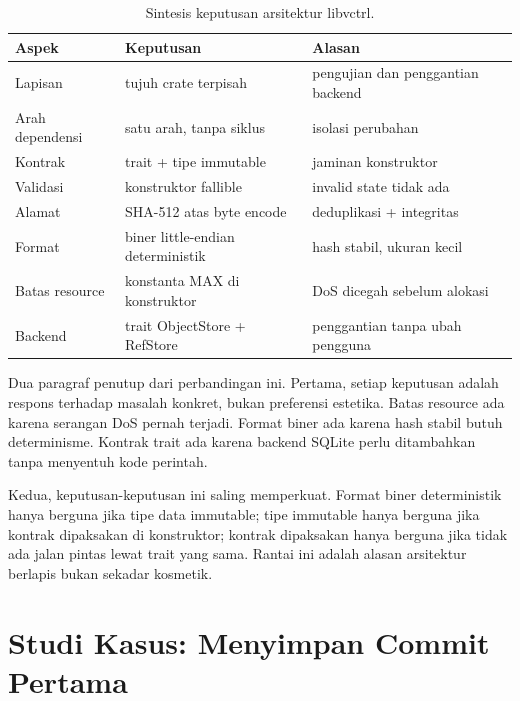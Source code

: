\documentclass[11pt,a4paper]{article}
\begin{document}
\begin{table}[H]
	\centering
	\caption{Sintesis keputusan arsitektur libvctrl.}
	\label{tab:synth}
	\footnotesize
	\begin{tabularx}{\textwidth}{l X X}
		\toprule
		Aspek           & Keputusan                         & Alasan                            \\
		\midrule
		Lapisan         & tujuh crate terpisah              & pengujian dan penggantian backend \\
		Arah dependensi & satu arah, tanpa siklus           & isolasi perubahan                 \\
		Kontrak         & trait + tipe immutable            & jaminan konstruktor               \\
		Validasi        & konstruktor fallible              & invalid state tidak ada           \\
		Alamat          & SHA-512 atas byte encode          & deduplikasi + integritas          \\
		Format          & biner little-endian deterministik & hash stabil, ukuran kecil         \\
		Batas resource  & konstanta MAX di konstruktor      & DoS dicegah sebelum alokasi       \\
		Backend         & trait ObjectStore + RefStore      & penggantian tanpa ubah pengguna   \\
		\bottomrule
	\end{tabularx}
\end{table}

Dua paragraf penutup dari perbandingan ini. Pertama, setiap keputusan adalah respons terhadap masalah konkret, bukan preferensi estetika. Batas resource ada karena serangan DoS pernah terjadi. Format biner ada karena hash stabil butuh determinisme. Kontrak trait ada karena backend SQLite perlu ditambahkan tanpa menyentuh kode perintah.

Kedua, keputusan-keputusan ini saling memperkuat. Format biner deterministik hanya berguna jika tipe data immutable; tipe immutable hanya berguna jika kontrak dipaksakan di konstruktor; kontrak dipaksakan hanya berguna jika tidak ada jalan pintas lewat trait yang sama. Rantai ini adalah alasan arsitektur berlapis bukan sekadar kosmetik.

\section{Studi Kasus: Menyimpan Commit Pertama}
\end{document}
